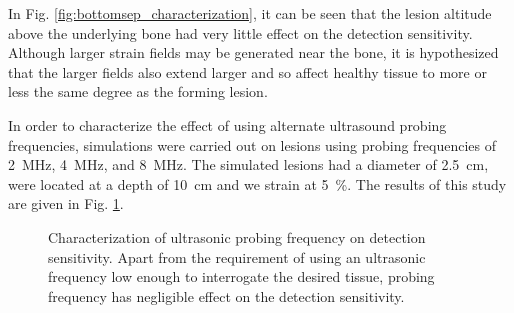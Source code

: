 			In Fig. \ref{fig:bottomsep_characterization}, it can be seen that the lesion altitude above the underlying bone had very little effect on the detection sensitivity. Although larger strain fields may be generated near the bone, it is hypothesized that the larger fields also extend larger and so affect healthy tissue to more or less the same degree as the forming lesion.

			In order to characterize the effect of using alternate ultrasound probing frequencies, simulations were carried out on lesions using probing frequencies of \SI{2}{\MHz}, \SI{4}{\MHz}, and \SI{8}{\MHz}. The simulated lesions had a diameter of \SI{2.5}{\cm}, were located at a depth of \SI{10}{\cm} and we strain at \SI{5}{\percent}. The results of this study are given in Fig. \ref{fig:freq_characterization}.

			\begin{figure}[!htb]
				\centering
				\caption[Quasi-static ultrasound probing frequency characterization]{Characterization of ultrasonic probing frequency on detection sensitivity. Apart from the requirement of using an ultrasonic frequency low enough to interrogate the desired tissue, probing frequency has negligible effect on the detection sensitivity.}
				\label{fig:freq_characterization}
			\end{figure}

